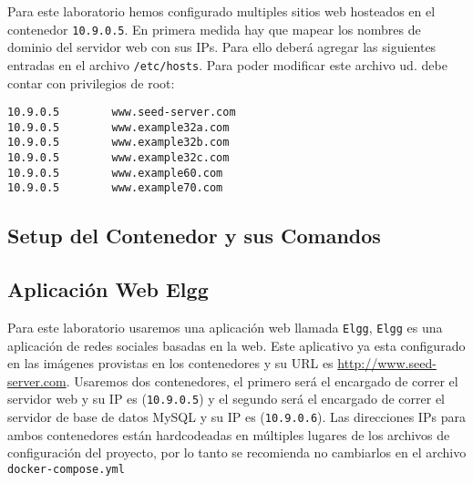 Para este laboratorio hemos configurado multiples sitios web hosteados en el contenedor \texttt{10.9.0.5}. En primera medida hay que mapear los nombres de dominio del servidor web con sus IPs. Para ello deberá agregar las siguientes entradas en el archivo \texttt{/etc/hosts}.
Para poder modificar este archivo ud. debe contar con privilegios de root:

\begin{lstlisting}
10.9.0.5        www.seed-server.com
10.9.0.5        www.example32a.com
10.9.0.5        www.example32b.com
10.9.0.5        www.example32c.com
10.9.0.5        www.example60.com
10.9.0.5        www.example70.com
\end{lstlisting}
 

\subsection{Setup del Contenedor y sus Comandos}





\subsection{Aplicación Web Elgg}

Para este laboratorio usaremos una aplicación web llamada {\tt Elgg}, {\tt Elgg} es una aplicación de redes sociales basadas en la web.
Este aplicativo ya esta configurado en las imágenes provistas en los contenedores y su URL es \url{http://www.seed-server.com}.
Usaremos dos contenedores, el primero será el encargado de correr el servidor web y su IP es (\texttt{10.9.0.5}) y el segundo será el encargado de correr el servidor de base de datos MySQL y su IP es (\texttt{10.9.0.6}). 
Las direcciones IPs para ambos contenedores están hardcodeadas en múltiples lugares de los archivos de configuración del proyecto, por lo tanto se recomienda no cambiarlos en el archivo \texttt{docker-compose.yml}







